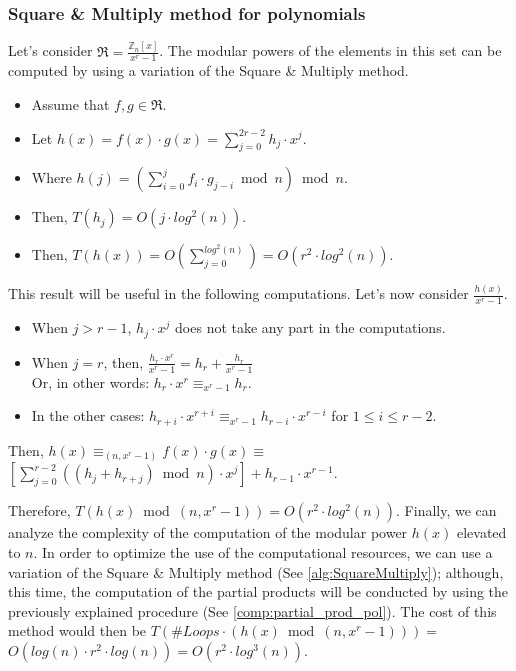\documentclass[12pt, a4paper, english]{report}
\begin{document}
\subsubsection{Square \& Multiply method for polynomials}
Let's consider $\Re = \frac{\mathbb{Z}_{n}[x]}{x^{r} - 1}$. The modular powers of the elements in this set can be computed by using a variation of the Square \& Multiply method. \newline
\begin{itemize}
    \item Assume that $f, g \in \Re$.
    \item Let $h(x) = f(x) \cdot g(x) = \sum_{j = 0}^{2r - 2} h_{j} \cdot x^{j}$.
    \item Where $h(j) = (\sum_{i=0}^{j} f_{i} \cdot g_{j - i} \bmod n) \bmod n$.
    \item Then, $T(h_{j}) = O(j \cdot log^{2}(n))$.
    \item Then, $T(h(x)) = O(\sum_{j = 0}^{log^{2}(n)}) = O(r^{2} \cdot log^{2}(n))$.
\end{itemize}
This result will be useful in the following computations. \newline
Let's now consider $\frac{h(x)}{x^{r} - 1}$.
\begin{itemize}
    \item When $j > r - 1$, $h_{j} \cdot x^{j}$ does not take any part in the computations.
    \item When $j = r$, then, $\frac{h_{r} \cdot x^{r}}{x^{r} - 1 } = h_{r} + \frac{h_{r}}{x^{r} - 1}$ \\ Or, in other words: $h_{r} \cdot x^{r} \equiv_{x^{r} - 1} h_{r}$.
    \item In the other cases: $h_{r+i} \cdot x^{r+i} \equiv_{x^{r} - 1} h_{r-i} \cdot x^{r-i}$ for $1 \leq i \leq r - 2$.
\end{itemize}
Then, $h(x) \equiv_{(n, x^{r} - 1)} f(x) \cdot g(x) \equiv$ \\ $[\sum_{j=0}^{r - 2}((h_{j} + h_{r + j}) \bmod n) \cdot x^{j}] + h_{r-1} \cdot x^{r-1}$.\label{comp:partial_prod_pol} \newline

Therefore, $T(h(x) \bmod (n, x^{r} - 1)) = O(r^{2} \cdot log^{2}(n))$. \newline
Finally, we can analyze the complexity of the computation of the modular power $h(x)$ elevated to $n$. \newline
In order to optimize the use of the computational resources, we can use a variation of the Square \& Multiply method (See \ref{alg:SquareMultiply});
although, this time, the computation of the partial products will be conducted by using the previously explained procedure (See \ref{comp:partial_prod_pol}). \newline
The cost of this method would then be $T(\#Loops \cdot (h(x) \bmod (n, x^{r} - 1))) =$ \\ $O(log(n) \cdot r^{2} \cdot log(n)) = O(r^{2} \cdot log^{3}(n))$.
\end{document}
